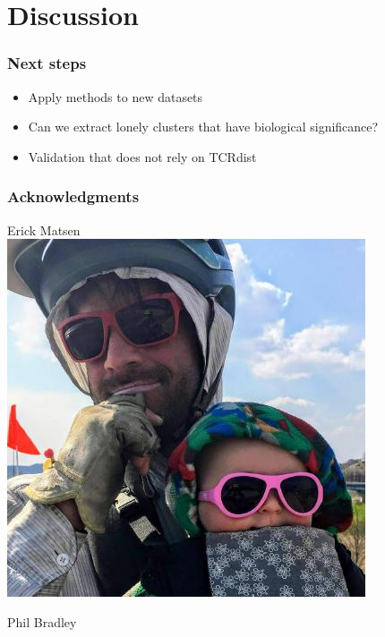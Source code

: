 \documentclass[mathserif,compress,xcolor={dvipsnames}]{beamer}
\renewcommand\;{\,}
\begin{document}
\section{Discussion}

\begin{frame}\frametitle{Next steps}
\begin{itemize}
\item
Apply methods to new datasets
\bigskip
\item
Can we extract lonely clusters that have biological significance?
\bigskip
\item
Validation that does not rely on TCRdist
\end{itemize}
\end{frame}


\begin{frame}\frametitle{Acknowledgments}
\begin{minipage}{0.49\linewidth}
\begin{center}
Erick Matsen
\\
\includegraphics[width=0.8\linewidth]{Images/Erick.jpeg}
\end{center}
\end{minipage}
\begin{minipage}{0.49\linewidth}
\begin{center}
Phil Bradley
\\

\end{center}
\end{minipage}
\end{frame}
\end{document}
